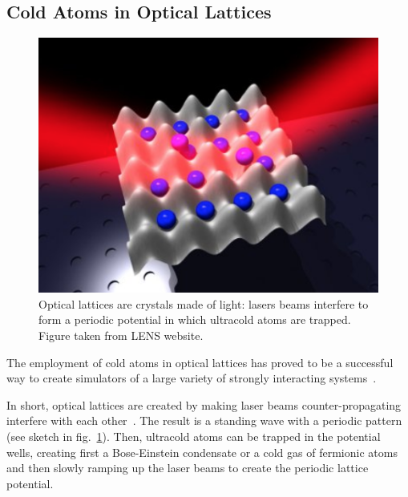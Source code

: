 \subsection{Cold Atoms in Optical Lattices}
\begin{figure}
    \centering
    \includegraphics[scale=0.7]{Figures/optical_lattice.png}
    \captionsetup{width=1.\linewidth}
    \caption{Optical lattices are crystals made of light: lasers beams interfere to form a periodic potential in which ultracold atoms are trapped. Figure taken from LENS website.}
    \label{fig:optical_lattice}
\end{figure}

The employment of cold atoms in optical lattices has proved to be a successful way to create simulators of a large variety of strongly interacting systems~\cite{ultracoldAtoms_condMatter}. 

In short, optical lattices are created by making laser beams counter-propagating interfere with each other~\cite{optical_lattice_interview}. The result is a standing wave with a periodic pattern (see sketch in fig.~\ref{fig:optical_lattice}). Then, ultracold atoms can be trapped in the potential wells, creating first a Bose-Einstein condensate or a cold gas of fermionic atoms and then slowly ramping up the laser beams to create the periodic lattice potential. 

